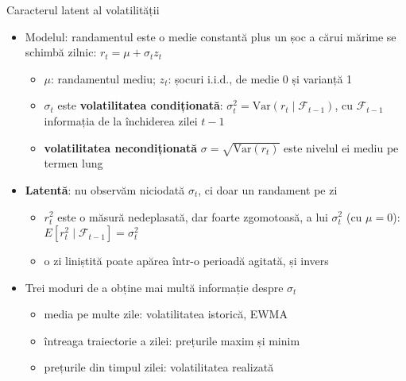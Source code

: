 \begin{frame}{Caracterul latent al volatilității}
\itemsize{\small}
\begin{itemize}
    \item Modelul: randamentul este o medie constantă plus un șoc a cărui mărime se schimbă zilnic: $r_t = \mu + \sigma_t z_t$
    \begin{itemize}
        \item $\mu$: randamentul mediu; $z_t$: șocuri i.i.d., de medie 0 și varianță 1
        \item $\sigma_t$ este \textbf{volatilitatea condiționată}: $\sigma_t^2 = \mathrm{Var}(r_t \mid \mathcal{F}_{t-1})$, cu $\mathcal{F}_{t-1}$ informația de la închiderea zilei $t-1$
        \item \textbf{volatilitatea necondiționată} $\sigma = \sqrt{\mathrm{Var}(r_t)}$ este nivelul ei mediu pe termen lung
    \end{itemize}
    \item \textbf{Latentă}: nu observăm niciodată $\sigma_t$, ci doar un randament pe zi
    \begin{itemize}
        \item $r_t^2$ este o măsură nedeplasată, dar foarte zgomotoasă, a lui $\sigma_t^2$ (cu $\mu = 0$): $E[r_t^2 \mid \mathcal{F}_{t-1}] = \sigma_t^2$
        \item o zi liniștită poate apărea într-o perioadă agitată, și invers
    \end{itemize}
    \item Trei moduri de a obține mai multă informație despre $\sigma_t$
    \begin{itemize}
        \item media pe multe zile: volatilitatea istorică, EWMA
        \item întreaga traiectorie a zilei: prețurile maxim și minim
        \item prețurile din timpul zilei: volatilitatea realizată
    \end{itemize}
\end{itemize}
\end{frame}

